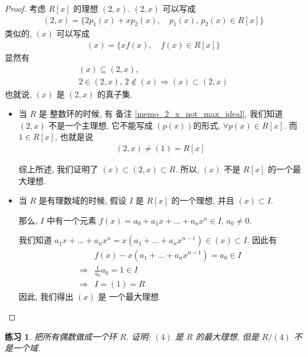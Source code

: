 \documentclass[utf8]{ctexbook}
\newtheorem{exercise}{练习}[section]
\begin{document}
\begin{proof}
考虑 $R[x]$ 的理想 $(2,x)$. $(2,x)$ 可以写成
\begin{align*}
(2,x) = \{  2 p_1 (x) + x p_2 (x), \quad p_1 (x), \, p_2(x) \in R[x] \}
\end{align*}
类似的, $(x)$ 可以写成
\begin{align*}
(x) = \{ x f(x), \quad f(x) \in R[x] \}
\end{align*}
显然有
\begin{align*}
(x) \subseteq (2,x), \\
2 \in (2, x), \, 2 \not \in (x) \Longrightarrow (x) \subset (2,x)
\end{align*}
也就说, $(x)$ 是 $(2,x)$ 的真子集.

\begin{itemize}
\item{当 $R$ 是 整数环的时候, 有 备注 \ref{memo_2_x_not_max_ideal}, 我们知道 $(2,x)$ 不是一个主理想, 它不能写成 $(p(x))$的形式, $\forall p(x) \in R[x]$. 而 $1 \in R[x]$, 也就是说
\begin{align*}
(2, x) \neq (1) = R[x]
\end{align*}

综上所述, 我们证明了 $(x) \subset (2,x) \subset R$. 所以, $(x)$ 不是 $R[x]$ 的一个最大理想.
}
\item{当 $R$ 是有理数域的时候, 假设 $I$ 是 $R[x]$ 的一个理想, 并且 $(x) \subset I$. 

那么, $I$ 中有一个元素 $f(x) = a_0 + a_1 x + \ldots + a_n x^n \in I$, $a_0 \neq 0$. 

我们知道 $a_1 x + \ldots + a_n x^n = x (a_1 + \ldots + a_n x^{n-1}  ) \in (x) \subset I$. 因此有
\begin{align*}
& f(x) - x (a_1 + \ldots + a_n x^{n-1}  ) = a_0 \in I \\
 \Longrightarrow & \frac{1}{a_0} a_0 = 1 \in I \\
 \Longrightarrow & I = (1) = R
\end{align*}
因此, 我们得出 $(x) $ 是 一个最大理想.
}
\end{itemize}
\end{proof}


\begin{exercise}
把所有偶数做成一个环 $R$. 证明: $(4)$ 是 $R$ 的最大理想, 但是 $R/(4)$ 不是一个域.
\end{exercise}
\end{document}
